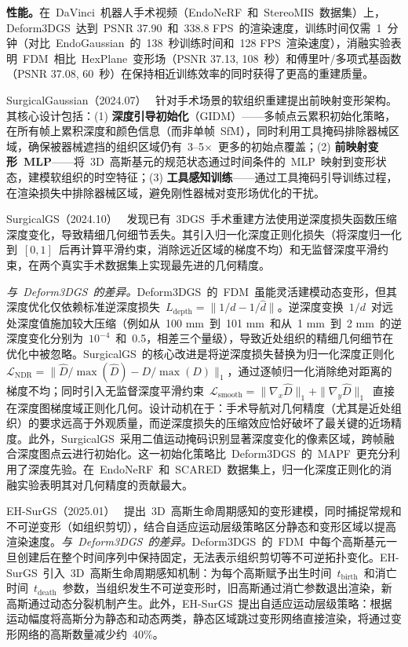 \textbf{性能。}在~DaVinci~机器人手术视频（EndoNeRF~和~StereoMIS~数据集）上，Deform3DGS~达到~PSNR 37.90~和~338.8 FPS~的渲染速度，训练时间仅需~1~分钟（对比~EndoGaussian~的~138~秒训练时间和~128 FPS~渲染速度），消融实验表明~FDM~相比~HexPlane~变形场（PSNR 37.13, 108~秒）和傅里叶/多项式基函数（PSNR 37.08, 60~秒）在保持相近训练效率的同时获得了更高的重建质量。

SurgicalGaussian（2024.07）~\cite{2407_05023} 针对手术场景的软组织重建提出前映射变形架构。其核心设计包括：(1) \textbf{深度引导初始化}（GIDM）——多帧点云累积初始化策略，在所有帧上累积深度和颜色信息（而非单帧~SfM），同时利用工具掩码排除器械区域，确保被器械遮挡的组织区域仍有~3--5$\times$~更多的初始点覆盖；(2) \textbf{前映射变形~MLP}——将~3D~高斯基元的规范状态通过时间条件的~MLP~映射到变形状态，建模软组织的时空特征；(3) \textbf{工具感知训练}——通过工具掩码引导训练过程，在渲染损失中排除器械区域，避免刚性器械对变形场优化的干扰。

SurgicalGS（2024.10）~\cite{2410_09292} 发现已有~3DGS~手术重建方法使用逆深度损失函数压缩深度变化，导致精细几何细节丢失。其引入归一化深度正则化损失（将深度归一化到~$[0,1]$~后再计算平滑约束，消除远近区域的梯度不均）和无监督深度平滑约束，在两个真实手术数据集上实现最先进的几何精度。

\textit{与~Deform3DGS~的差异。}Deform3DGS~的~FDM~虽能灵活建模动态变形，但其深度优化仅依赖标准逆深度损失~$L_{\text{depth}} = \|1/d - 1/\hat{d}\|$。逆深度变换~$1/d$~对远处深度值施加较大压缩（例如从~100 mm~到~101 mm~和从~1 mm~到~2 mm~的逆深度变化分别为~$10^{-4}$~和~0.5，相差三个量级），导致近处组织的精细几何细节在优化中被忽略。SurgicalGS~的核心改进是将逆深度损失替换为归一化深度正则化~$\mathcal{L}_{\text{NDR}} = \|\hat{D}/\max(\hat{D}) - D/\max(D)\|_1$，通过逐帧归一化消除绝对距离的梯度不均；同时引入无监督深度平滑约束~$\mathcal{L}_{\text{smooth}} = \|\nabla_x \hat{D}\|_1 + \|\nabla_y \hat{D}\|_1$~直接在深度图梯度域正则化几何。设计动机在于：手术导航对几何精度（尤其是近处组织）的要求远高于外观质量，而逆深度损失的压缩效应恰好破坏了最关键的近场精度。此外，SurgicalGS~采用二值运动掩码识别显著深度变化的像素区域，跨帧融合深度图点云进行初始化。这一初始化策略比~Deform3DGS~的~MAPF~更充分利用了深度先验。在~EndoNeRF~和~SCARED~数据集上，归一化深度正则化的消融实验表明其对几何精度的贡献最大。

EH-SurGS（2025.01）~\cite{2501_01101} 提出~3D~高斯生命周期感知的变形建模，同时捕捉常规和不可逆变形（如组织剪切），结合自适应运动层级策略区分静态和变形区域以提高渲染速度。\textit{与~Deform3DGS~的差异。}Deform3DGS~的~FDM~中每个高斯基元一旦创建后在整个时间序列中保持固定，无法表示组织剪切等不可逆拓扑变化。EH-SurGS~引入~3D~高斯生命周期感知机制：为每个高斯赋予出生时间~$t_{\text{birth}}$~和消亡时间~$t_{\text{death}}$~参数，当组织发生不可逆变形时，旧高斯通过消亡参数退出渲染，新高斯通过动态分裂机制产生。此外，EH-SurGS~提出自适应运动层级策略：根据运动幅度将高斯分为静态和动态两类，静态区域跳过变形网络直接渲染，将通过变形网络的高斯数量减少约~40\%。

